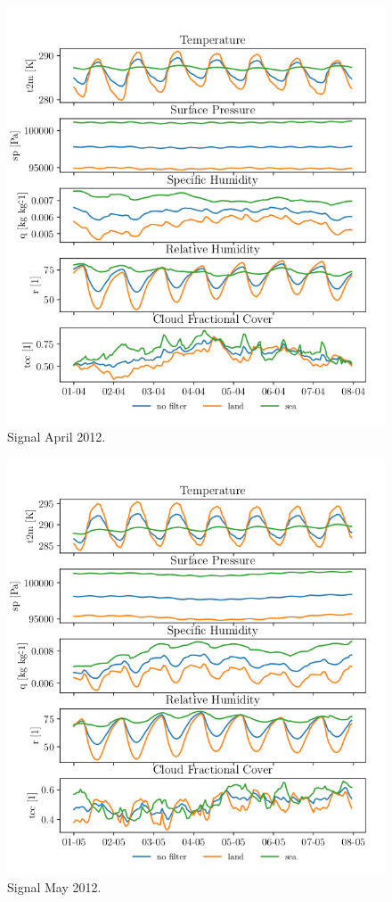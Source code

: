 \begin{figure}[ht]
    \centering
    \includegraphics{python_figs/spatially_averaged_one_week_from_2012-04-01.png}
    \caption{Signal April 2012.}
    \label{fig:april12}
\end{figure}
\begin{figure}[ht]
    \centering
    \includegraphics{python_figs/spatially_averaged_one_week_from_2012-05-01.png}
    \caption{Signal May 2012.}
    \label{fig:may12}
\end{figure}
